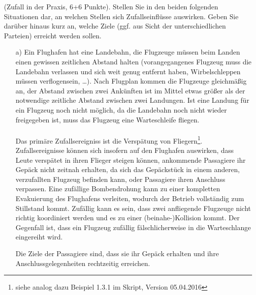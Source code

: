 \documentclass[twoside]{article}
\begin{document}
%
%
(Zufall in der Praxis, 6+6 Punkte).
Stellen Sie in den beiden folgenden Situationen dar, an welchen Stellen sich Zufallseinflüsse auswirken.
Geben Sie darüber hinaus kurz an, welche Ziele (ggf. aus Sicht der unterschiedlichen Parteien) erreicht werden sollen.
\begin{enumerate}
	\item[a)] Ein Flughafen hat eine Landebahn, die Flugzeuge müssen beim Landen einen gewissen zeitlichen Abstand halten (vorangegangenes Flugzeug muss die Landebahn verlassen und sich weit genug entfernt haben, Wirbelschleppen müssen \dq verflogen\dq  sein, \dots).
	Nach Flugplan kommen die Flugzeuge gleichmäßig an, der Abstand zwischen zwei Ankünften ist im Mittel etwas größer als der notwendige zeitliche Abstand zwischen zwei Landungen.
	Ist eine Landung für ein Flugzeug noch nicht möglich, da die Landebahn noch nicht wieder freigegeben ist, muss das Flugzeug eine Warteschleife fliegen.\\
	\vspace{.5cm}\\
	Das primäre Zufallsereigniss ist die Verspätung von Fliegern\footnote{siehe analog dazu Beispiel 1.3.1 im Skript, Version 05.04.2016}.
	Zufallsereignisse können sich insofern auf den Flughafen auswirken, dass Leute verspätet in ihren Flieger steigen können, ankommende Passagiere ihr Gepäck nicht zeitnah erhalten, da sich das Gepäckstück in einem anderen, verzufallten Flugzeug befinden kann, oder Passagiere ihren Anschluss verpassen.
	Eine zufällige Bombendrohung kann zu einer kompletten Evakuierung des Flughafens verleiten, wodurch der Betrieb vollständig zum Stillstand kommt.
	Zufällig kann es sein, dass zwei anfliegende Flugzeuge nicht richtig koordiniert werden und es zu einer (beinahe-)Kollision kommt.
	Der Gegenfall ist, dass ein Flugzeug zufällig fälschlicherweise in die Warteschlange eingereiht wird.
	
	Die Ziele der Passagiere sind, dass sie ihr Gepäck erhalten und ihre Anschlussgelegenheiten rechtzeitig erreichen.
	

\end{enumerate}
\end{document}
